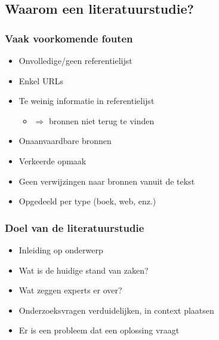 \documentclass{beamer}
\begin{document}
\subsection{Waarom een literatuurstudie?}


\begin{frame}
  \frametitle{Vaak voorkomende fouten}

  \begin{itemize}
    \item Onvolledige/geen referentielijst
    \item Enkel URLs
    \item Te weinig informatie in referentielijst
      \begin{itemize}
        \item $\Rightarrow$ bronnen niet terug te vinden
      \end{itemize}
    \item Onaanvaardbare bronnen
    \item Verkeerde opmaak
    \item Geen verwijzingen naar bronnen vanuit de tekst
    \item Opgedeeld per type (boek, web, enz.)
  \end{itemize}
\end{frame}

\begin{frame}
  \frametitle{Doel van de literatuurstudie}

  \begin{itemize}
    \item Inleiding op onderwerp
    \item Wat is de huidige stand van zaken?
    \item Wat zeggen experts er over?
    \item Onderzoeksvragen verduidelijken, in context plaatsen
    \item Er is een probleem dat een oplossing vraagt
  \end{itemize}

  \vfill

\end{frame}
\end{document}
